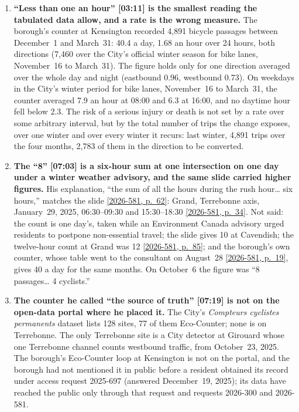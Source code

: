 \documentclass[11pt,letterpaper]{article}
\newcommand{\pagesurl}{https://openmobilitydata.github.io/Terrebonne-access-requests}
\newcommand{\cliptime}[1]{\textsf{\small[#1]}}
\newcommand{\pgl}[2]{\href{\pagesurl/2026-581/raw/01_emails_mandate_counts.pdf\#page=#1}{\textsf{\small[2026-581, p.~#2]}}}
\newcommand{\pg}[1]{\pgl{#1}{#1}}
\begin{document}
\begin{enumerate}[nosep]
  \item \begin{minipage}[t]{\linewidth}\textbf{``Less than one an hour'' \cliptime{03:11} is the smallest reading the tabulated data allow, and a rate is the wrong measure.} The borough's counter at Kensington recorded 4{,}891 bicycle passages between December~1 and March~31: 40.4 a day, 1.68 an hour over 24 hours, both directions (7{,}460 over the City's official winter season for bike lanes, November~16 to March~31). The figure holds only for one direction averaged over the whole day and night (eastbound 0.96, westbound 0.73). On weekdays in the City's winter period for bike lanes, November~16 to March~31, the counter averaged 7.9 an hour at 08:00 and 6.3 at 16:00, and no daytime hour fell below 2.3. The risk of a serious injury or death is not set by a rate over some arbitrary interval, but by the total number of trips the change exposes, over one winter and over every winter it recurs: last winter, 4{,}891 trips over the four months, 2{,}783 of them in the direction to be converted.\end{minipage}\vspace{0.35em}
  \item \begin{minipage}[t]{\linewidth}\textbf{The ``8'' \cliptime{07:03} is a six-hour sum at one intersection on one day under a winter weather advisory, and the same slide carried higher figures.} His explanation, ``the sum of all the hours during the rush hour… six hours,'' matches the slide \pg{62}: Grand, Terrebonne axis, January~29, 2025, 06:30--09:30 and 15:30--18:30 \pg{34}. Not said: the count is one day's, taken while an Environment Canada advisory urged residents to postpone non-essential travel; the slide gives 10 at Cavendish; the twelve-hour count at Grand was 12 \pg{85}; and the borough's own counter, whose table went to the consultant on August~28 \pg{19}, gives 40 a day for the same months. On October~6 the figure was ``8 passages… 4 cyclists.''\end{minipage}\vspace{0.35em}
  \item \begin{minipage}[t]{\linewidth}\textbf{The counter he called ``the source of truth'' \cliptime{07:19} is not on the open-data portal where he placed it.} The City's \emph{Compteurs cyclistes permanents} dataset lists 128 sites, 77 of them Eco-Counter; none is on Terrebonne. The only Terrebonne site is a City detector at Girouard whose one Terrebonne channel counts westbound traffic, from October~23, 2025. The borough's Eco-Counter loop at Kensington is not on the portal, and the borough had not mentioned it in public before a resident obtained its record under access request 2025-697 (answered December~19, 2025); its data have reached the public only through that request and requests 2026-300 and 2026-581.\end{minipage}\vspace{0.35em}

\end{enumerate}
\end{document}
